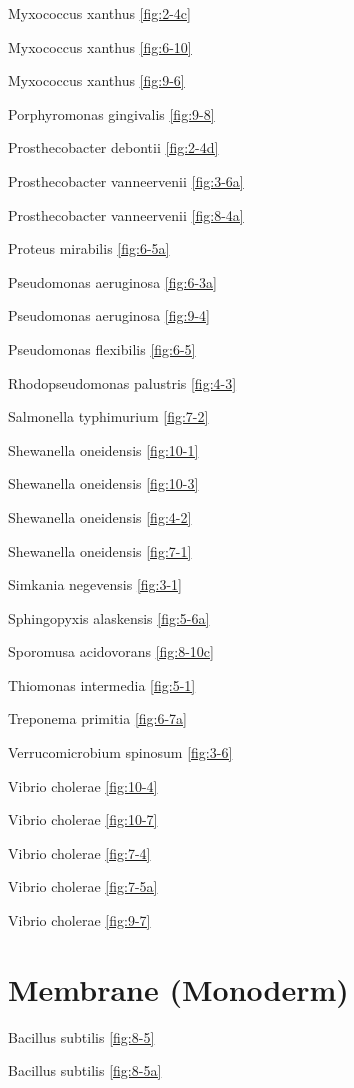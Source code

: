 \documentclass[]{tufte-book}
\begin{document}
Myxococcus xanthus \ref{fig:2-4c}

Myxococcus xanthus \ref{fig:6-10}

Myxococcus xanthus \ref{fig:9-6}

Porphyromonas gingivalis \ref{fig:9-8}

Prosthecobacter debontii \ref{fig:2-4d}

Prosthecobacter vanneervenii \ref{fig:3-6a}

Prosthecobacter vanneervenii \ref{fig:8-4a}

Proteus mirabilis \ref{fig:6-5a}

Pseudomonas aeruginosa \ref{fig:6-3a}

Pseudomonas aeruginosa \ref{fig:9-4}

Pseudomonas flexibilis \ref{fig:6-5}

Rhodopseudomonas palustris \ref{fig:4-3}

Salmonella typhimurium \ref{fig:7-2}

Shewanella oneidensis \ref{fig:10-1}

Shewanella oneidensis \ref{fig:10-3}

Shewanella oneidensis \ref{fig:4-2}

Shewanella oneidensis \ref{fig:7-1}

Simkania negevensis \ref{fig:3-1}

Sphingopyxis alaskensis \ref{fig:5-6a}

Sporomusa acidovorans \ref{fig:8-10c}

Thiomonas intermedia \ref{fig:5-1}

Treponema primitia \ref{fig:6-7a}

Verrucomicrobium spinosum \ref{fig:3-6}

Vibrio cholerae \ref{fig:10-4}

Vibrio cholerae \ref{fig:10-7}

Vibrio cholerae \ref{fig:7-4}

Vibrio cholerae \ref{fig:7-5a}

Vibrio cholerae \ref{fig:9-7}

\section*{Membrane (Monoderm)}\label{membrane-monoderm}

Bacillus subtilis \ref{fig:8-5}

Bacillus subtilis \ref{fig:8-5a}
\end{document}
